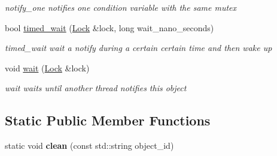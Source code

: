 \begin{DoxyCompactItemize}
\begin{DoxyCompactList}\small\item\em notify\+\_\+one notifies one condition variable with the same mutex \end{DoxyCompactList}\item 
bool \hyperlink{classshared__memory_1_1ConditionVariable_af7b1ce584ff9ef9a0925f57cae8e6263}{timed\+\_\+wait} (\hyperlink{classshared__memory_1_1Lock}{Lock} \&lock, long wait\+\_\+nano\+\_\+seconds)
\begin{DoxyCompactList}\small\item\em timed\+\_\+wait wait a notify during a certain certain time and then wake up \end{DoxyCompactList}\item 
void \hyperlink{classshared__memory_1_1ConditionVariable_a8746faccdf81b03dd36c5b405c9ab48d}{wait} (\hyperlink{classshared__memory_1_1Lock}{Lock} \&lock)\hypertarget{classshared__memory_1_1ConditionVariable_a8746faccdf81b03dd36c5b405c9ab48d}{}\label{classshared__memory_1_1ConditionVariable_a8746faccdf81b03dd36c5b405c9ab48d}

\begin{DoxyCompactList}\small\item\em wait waits until another thread notifies this object \end{DoxyCompactList}\end{DoxyCompactItemize}
\subsection*{Static Public Member Functions}
\begin{DoxyCompactItemize}
\item 
static void {\bfseries clean} (const std\+::string object\+\_\+id)\hypertarget{classshared__memory_1_1ConditionVariable_adf6a90466c2bf96cbc08f3ba0246274e}{}\label{classshared__memory_1_1ConditionVariable_adf6a90466c2bf96cbc08f3ba0246274e}

\end{DoxyCompactItemize}
